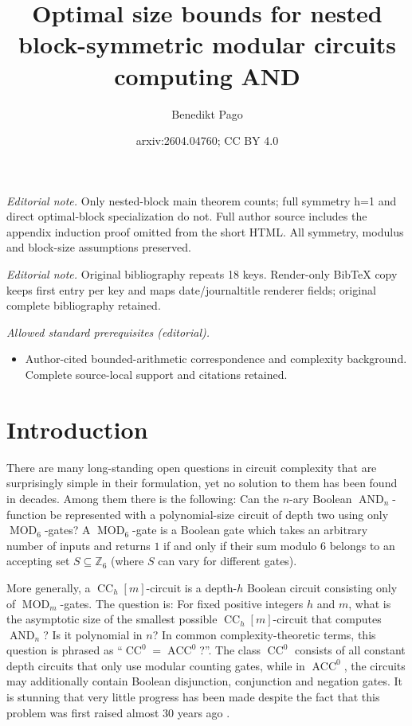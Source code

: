 \documentclass[11pt]{article}
\title{Optimal size bounds for nested block-symmetric modular circuits computing AND}
\author{Benedikt Pago}
\date{arxiv:2604.04760; CC BY 4.0}
\DeclareMathOperator{\MOD}{MOD}
\DeclareMathOperator{\AND}{AND}
\newcommand{\bbZ}{\mathbb{Z}}
\theoremstyle{definition}
\theoremstyle{plain}
\theoremstyle{remark}
\theoremstyle{remark}
\DeclareMathOperator{\CC}{CC}
\DeclareMathOperator{\ACC}{ACC}
\begin{document}
\maketitle
\noindent\textit{Editorial note.} Only nested-block main theorem counts; full symmetry h=1 and direct optimal-block specialization do not. Full author source includes the appendix induction proof omitted from the short HTML. All symmetry, modulus and block-size assumptions preserved.\par\medskip
\noindent\textit{Editorial note.} Original bibliography repeats 18 keys. Render-only BibTeX copy keeps first entry per key and maps date/journaltitle renderer fields; original complete bibliography retained.\par\medskip
\noindent\textit{Allowed standard prerequisites (editorial).}\begin{itemize}
\item Author-cited bounded-arithmetic correspondence and complexity background. Complete source-local support and citations retained.
\end{itemize}\medskip
\section{Introduction}
There are many long-standing open questions in circuit complexity that are surprisingly simple in their formulation, yet no solution to them has been found in decades.
Among them there is the following: Can the $n$-ary Boolean $\AND_n$-function be represented with a polynomial-size circuit of depth two using only $\MOD_6$-gates?
A $\MOD_6$-gate is a Boolean gate which takes an arbitrary number of inputs and returns $1$ if and only if their sum modulo $6$ belongs to an accepting set $S \subseteq \bbZ_6$ (where $S$ can vary for different gates). 

More generally, a $\CC_h[m]$-circuit is a depth-$h$ Boolean circuit consisting only of $\MOD_m$-gates. 
The question is: For fixed positive integers $h$ and $m$, what is the asymptotic size of the smallest possible $\CC_h[m]$-circuit that computes $\AND_n$? Is it polynomial in $n$?
In common complexity-theoretic terms, this question is phrased as ``$\CC^0 = \ACC^0$?''.
The class $\CC^0$ consists of all constant depth circuits that only use modular counting gates, while in $\ACC^0$, the circuits may additionally contain Boolean disjunction, conjunction and negation gates.
It is stunning that very little progress has been made despite the fact that this problem was first raised almost 30 years ago \cite{BarringtonST90}. 
\end{document}
